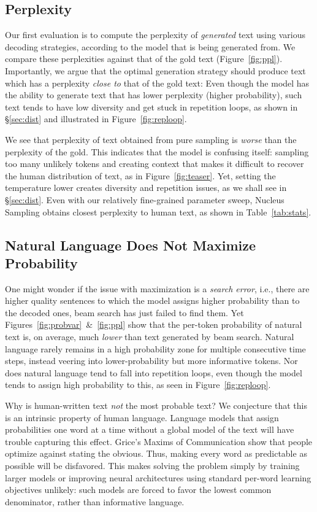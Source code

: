 \subsection{Perplexity}

Our first evaluation is to compute the perplexity of \emph{generated} text using various decoding strategies, according to the model that is being generated from. We compare these perplexities against that of the gold text (Figure~\ref{fig:ppl}). 
Importantly, we argue that the optimal generation strategy should produce text which has a perplexity \emph{close to} that of the gold text: Even though the model has the ability to generate text that has lower perplexity (higher probability), such text tends to have low diversity and get stuck in repetition loops, as shown in \S\ref{sec:dist} and illustrated in Figure~\ref{fig:reploop}.

We see that perplexity of text obtained from pure sampling is \emph{worse} than the perplexity of the gold. This indicates that the model is confusing itself: sampling too many unlikely tokens and creating context that makes it difficult to recover the human distribution of text, as in Figure~\ref{fig:teaser}. Yet, setting the temperature lower creates diversity and repetition issues, as we shall see in \S\ref{sec:dist}. Even with our relatively fine-grained parameter sweep, Nucleus Sampling obtains closest perplexity to human text, as shown in Table~\ref{tab:stats}.

\subsection{Natural Language Does Not Maximize Probability}

One might wonder if the issue with maximization is a \emph{search error}, i.e., there are higher quality sentences to which the model assigns higher probability than to the decoded ones, beam search has just failed to find them. Yet Figures~\ref{fig:probvar}~\&~\ref{fig:ppl} show that the per-token probability of natural text is, on average, much \emph{lower} than text generated by beam search. Natural language rarely remains in a high probability zone for multiple consecutive time steps, instead veering into lower-probability but more informative tokens. Nor does natural language tend to fall into repetition loops, even though the model tends to assign high probability to this, as seen in Figure~\ref{fig:reploop}.

Why is human-written text \emph{not} the most probable text? We conjecture that this is an intrinsic property of human language. Language models that assign probabilities one word at a time without a global model of the text will have trouble capturing this effect. Grice's Maxims of Communication \citep{Grice1975} show that people optimize against stating the obvious. Thus, making every word as predictable as possible will be disfavored. This makes solving the problem simply by training larger models or improving neural architectures using standard per-word learning objectives unlikely: such models are forced to favor the lowest common denominator, rather than informative language. 

